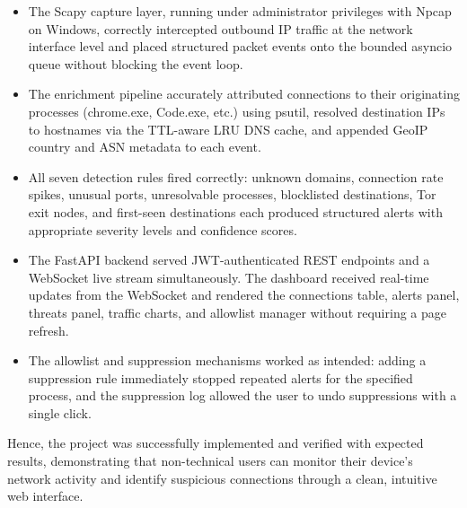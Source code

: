 \documentclass[12pt]{article}
\begin{document}
\begin{itemize}
    \item The Scapy capture layer, running under administrator privileges with
          Npcap on Windows, correctly intercepted outbound IP traffic at the
          network interface level and placed structured packet events onto the
          bounded asyncio queue without blocking the event loop.

    \item The enrichment pipeline accurately attributed connections to their
          originating processes (chrome.exe, Code.exe, etc.) using psutil,
          resolved destination IPs to hostnames via the TTL-aware LRU DNS
          cache, and appended GeoIP country and ASN metadata to each event.

    \item All seven detection rules fired correctly: unknown domains, connection
          rate spikes, unusual ports, unresolvable processes, blocklisted
          destinations, Tor exit nodes, and first-seen destinations each
          produced structured alerts with appropriate severity levels and
          confidence scores.

    \item The FastAPI backend served JWT-authenticated REST endpoints and a
          WebSocket live stream simultaneously. The dashboard received real-time
          updates from the WebSocket and rendered the connections table, alerts
          panel, threats panel, traffic charts, and allowlist manager without
          requiring a page refresh.

    \item The allowlist and suppression mechanisms worked as intended: adding a
          suppression rule immediately stopped repeated alerts for the specified
          process, and the suppression log allowed the user to undo suppressions
          with a single click.
\end{itemize}

\noindent Hence, the project was successfully implemented and verified with
expected results, demonstrating that non-technical users can monitor their
device's network activity and identify suspicious connections through a clean,
intuitive web interface.
\end{document}
